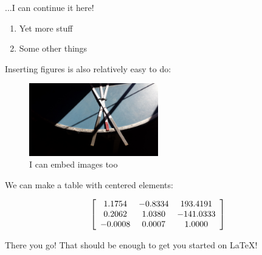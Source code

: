 \documentclass[a4paper,12pt]{article} %
\begin{document}
...I can continue it here!

\vspace{5mm}
\begin{enumerate}[resume]
\item Yet more stuff
\item Some other things
\end{enumerate}
\vspace{5mm}

Inserting figures is also relatively easy to do: 

\vspace{5mm}
\begin{figure}[!ht]
  \centering
  \includegraphics[width=0.5\textwidth]{test_image.jpg}
  \caption{I can embed images too}
\end{figure}

\noindent
We can make a table with centered elements:

\vspace{5mm}
\[ \left[ \begin{array}{c c c}
1.1754 & -0.8334 & 193.4191\\
0.2062 & 1.0380 & -141.0333\\
-0.0008 & 0.0007 & 1.0000\\
\end{array}
\right] \]
\vspace{5mm}

\noindent
There you go! That should be enough to get you started on \LaTeX!

\lstlistoflistings
\end{document}
